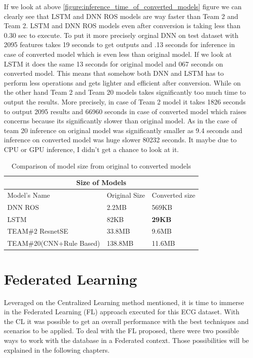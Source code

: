 If we look at above \ref{figure:inference_time_of_converted_models} figure we can clearly see that LSTM and DNN ROS models are way faster than Team 2 and Team 2. LSTM and DNN ROS models even after conversion is taking less than 0.30 sec to execute. To put it more precisely orginal DNN on test dataset with 2095 features takes 19 seconds to get outputs and .13 seconds for inference in case of converted model which is even less than original model. If we look at LSTM it does the same 13 seconds for original model and 067 seconds on converted model. This means that somehow both DNN and LSTM has to perform less operations and gets lighter and efficient after conversion. While on the other hand Team 2 and Team 20 models takes significantly too much time to output the results. More precisely, in case of Team 2 model it takes 1826 seconds to output 2095 results and 66960 seconds in case of converted model which raises concerns because its significantly slower than original model. As in the case of team 20 inference on original model was significantly smaller as 9.4 seconds and inference on converted model was huge slower 80232 seconds. It maybe due to CPU or GPU inference, I didn't get a chance to look at it. 

\begin{table}
\centering
\begin{tabular}{ |p{5cm}||p{3cm}|p{3cm}|}
 \hline
 \multicolumn{3}{|c|}{Size of Models} \\
 \hline
 Model's Name& Original Size&Converted size\\
 \hline
 DNN ROS   & 2.2MB   &   569KB\\
 LSTM&  82KB   & \textbf{29KB} \\
 TEAM\#2 ResnetSE &33.8MB & 9.6MB\\
 TEAM\#20(CNN+Rule Based) & 138.8MB & 11.6MB\\
 \hline
\end{tabular}
 \caption{\label{tab:models_size_after_conversion}Comparison of model size from original to converted models}
 \end{table}


\section{Federated Learning} \label{5FL}

Leveraged on the Centralized Learning method mentioned, it is time to immerse in the Federated Learning (FL) approach executed for this ECG dataset. With the CL it was possible to get an overall performance with the best techniques and scenarios to be applied. To deal with the FL proposed, there were two possible ways to work with the database in a Federated context. Those possibilities will be explained in the following chapters.

